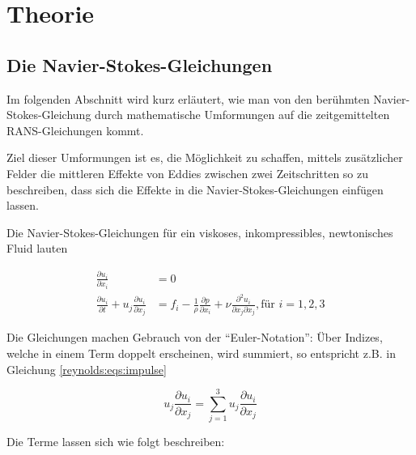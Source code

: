%
%
%
%
\section{Theorie\label{reynolds:section:teil0}}
\subsection{Die Navier-Stokes-Gleichungen}

Im folgenden Abschnitt wird kurz erläutert, wie man von den berühmten Navier-Stokes-Gleichung
durch mathematische Umformungen auf die zeitgemittelten RANS-Gleichungen kommt.

Ziel dieser Umformungen ist es, die Möglichkeit zu schaffen, mittels zusätzlicher Felder
die mittleren Effekte von Eddies zwischen zwei Zeitschritten so zu beschreiben, dass sich die
Effekte in die Navier-Stokes-Gleichungen einfügen lassen.



Die Navier-Stokes-Gleichungen für ein viskoses, inkompressibles, newtonisches Fluid lauten

\begin{align}
    \label{reynolds:eqs:mass}
    \frac{\partial u_i}{\partial x_i} &= 0 \\
    \label{reynolds:eqs:impulse}
    \frac{\partial u_i}{\partial t} + u_j \frac{\partial u_i}{\partial x_j} &=
        f_i - \frac{1}{\rho} \frac{\partial p}{\partial x_i} + 
        \nu \frac{\partial^2 u_i}{\partial x_j \partial x_j}, \text{für $i = 1,2,3$}
\end{align}

Die Gleichungen machen Gebrauch von der ``Euler-Notation'': Über Indizes, welche in einem Term doppelt
erscheinen, wird summiert, so entspricht z.B. in Gleichung \ref{reynolds:eqs:impulse}

\begin{equation}
u_j \frac{\partial u_i}{\partial x_j} = \sum_{j=1}^{3} u_j \frac{\partial u_i}{\partial x_j}
\end{equation}

Die Terme lassen sich wie folgt beschreiben:


